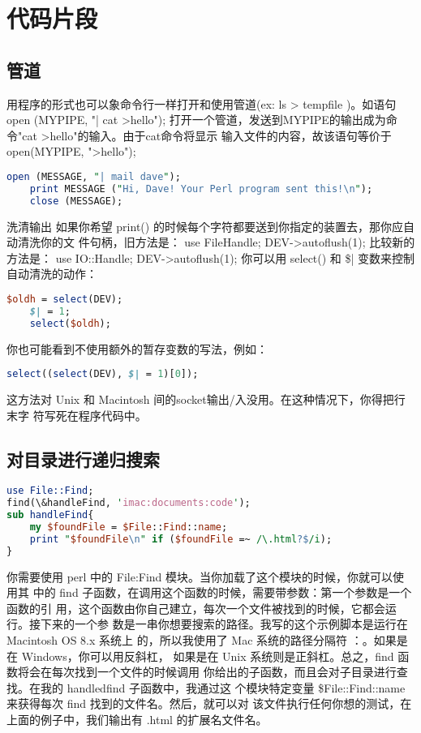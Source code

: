 \documentclass[a4paper,11pt]{book}
\begin{document}
\section{代码片段}
\subsection{管道}
用程序的形式也可以象命令行一样打开和使用管道(ex: ls > tempfile )。如语句
  	open (MYPIPE, "| cat >hello"); 
打开一个管道，发送到MYPIPE的输出成为命令"cat >hello"的输入。由于cat命令将显示
输入文件的内容，故该语句等价于
		open(MYPIPE, ">hello"); 

\begin{lstlisting}[language=perl, caption=用管道发送邮件]
    open (MESSAGE, "| mail dave");
    print MESSAGE ("Hi, Dave! Your Perl program sent this!\n");
    close (MESSAGE);   
\end{lstlisting}
    
	
洗清输出 
如果你希望 print() 的时候每个字符都要送到你指定的装置去，那你应自动清洗你的文
件句柄，旧方法是： 
use FileHandle; 
DEV->autoflush(1); 
比较新的方法是： 
use IO::Handle; 
DEV->autoflush(1); 
你可以用 select() 和 \$| 变数来控制自动清洗的动作：
\begin{lstlisting}[language=perl]
    $oldh = select(DEV); 
    $| = 1; 
    select($oldh); 
\end{lstlisting}
你也可能看到不使用额外的暂存变数的写法，例如： 
\begin{lstlisting}[language=perl]
    select((select(DEV), $| = 1)[0]);
\end{lstlisting}
这方法对 Unix 和 Macintosh 间的socket输出/入没用。在这种情况下，你得把行末字
符写死在程序代码中。 

\subsection{对目录进行递归搜索}
\begin{lstlisting}[language=perl]
 use File::Find;
find(\&handleFind, 'imac:documents:code');
sub handleFind{
    my $foundFile = $File::Find::name;
    print "$foundFile\n" if ($foundFile =~ /\.html?$/i);
}
\end{lstlisting}
你需要使用 perl 中的 File:Find 模块。当你加载了这个模块的时候，你就可以使用其
中的 find 子函数，在调用这个函数的时候，需要带参数：第一个参数是一个函数的引
用，这个函数由你自己建立，每次一个文件被找到的时候，它都会运行。接下来的一个参
数是一串你想要搜索的路径。我写的这个示例脚本是运行在 Macintosh OS 8.x 系统上
的，所以我使用了 Mac 系统的路径分隔符 ：。如果是在 Windows，你可以用反斜杠，
如果是在 Unix 系统则是正斜杠。总之，find 函数将会在每次找到一个文件的时候调用
你给出的子函数，而且会对子目录进行查找。在我的 handledfind 子函数中，我通过这
个模块特定变量 \$File::Find::name 来获得每次 find 找到的文件名。然后，就可以对
该文件执行任何你想的测试，在上面的例子中，我们输出有 .html 的扩展名文件名。
\end{document}
